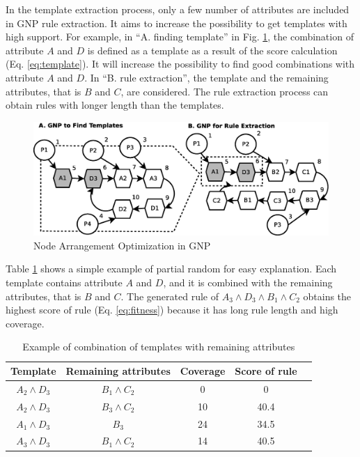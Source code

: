\documentclass{elsart}
\begin{document}
In the template extraction process, only a few number of attributes are included in GNP rule extraction. It aims to increase the possibility to get templates with high support. For example, in ``A. finding template'' in Fig. \ref{newgnp}, the combination of attribute $A$ and $D$ is defined as a template as a result of the score calculation (Eq. \ref{eq:template}). It will increase the possibility to find good combinations with attribute $A$ and $D$. In ``B. rule extraction'', the template and the remaining attributes, that is $B$ and $C$, are considered. 
The rule extraction process can obtain rules with longer length than the templates.

\begin{figure}[tb]
\begin{center}
\includegraphics[width=14cm]{images/gnpdatamining2}
\caption{\label{newgnp} Node Arrangement Optimization in GNP}
\end{center}
\end{figure}

Table \ref{partial-random-combination-example2} shows a simple example of partial random for easy explanation. 
Each template contains attribute $A$ and $D$, and it is combined with the remaining attributes, that is $B$ and $C$. 
The generated rule of $A_{3} \wedge D_{3} \wedge B_{1} \wedge C_{2}$ obtains the highest score of rule (Eq. \ref{eq:fitness}) because it has long rule length and high coverage.

\begin{table}[tb]
\caption{\label{partial-random-combination-example2}Example of combination of templates with remaining attributes}
\begin{flushleft}
\begin{tabular}{|c|c|c|c|c|}
\hline 
Template & Remaining attributes & Coverage & Score of rule \tabularnewline
\hline 
$A_{2}\wedge D_{3}$ & $B_{1}\wedge C_{2}$ & 0 & 0\tabularnewline
\hline 
$A_{2}\wedge D_{3}$ & $B_{3}\wedge C_{2}$ & 10 & 40.4\tabularnewline
\hline 
$A_{1}\wedge D_{3}$ & $B_{3}$ & 24 & 34.5\tabularnewline
\hline 
$A_{3}\wedge D_{3}$ & $B_{1}\wedge C_{2}$ & 14 & 40.5\tabularnewline
\hline 
\end{tabular}
\end{flushleft}
\end{table}
\end{document}
